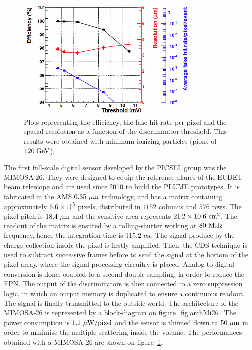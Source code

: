     \begin{figure}
      \centering
      \includegraphics[width=0.8\textwidth]{Pictures/vxd/MIMOSA26_chip26_HR15_20deg}
      \caption{Plots representing the efficiency, the fake hit rate per pixel and the spatial resolution as a function of the discriminator threshold. This results were obtained with minimum ionizing particles (pions of $120~\rm{GeV}$).}
      \label{fig:mi26Perf}
    \end{figure}

    The first full-scale digital sensor developed by the PICSEL group was the \gls{MIMOSA}-26.
    They were designed to equip the reference planes of the EUDET beam telescope and are used since 2010 to build the PLUME prototypes.
    It is fabricated in the AMS $0.35~\rm{\mu m}$ technology, and has a matrix containing approximately $6.6 \times 10^5$ pixels, distributed in $1152$ columns and $576$ rows.
    The pixel pitch is $18.4~\rm{\mu m}$ and the sensitive area represents $21.2 \times 10.6~\rm{cm}^2$.
    The readout of the matrix is ensured by a rolling-shutter working at $80~\rm{MHz}$ frequency, hence the integration time is $115.2~\rm{\mu s}$.
    The signal produce by the charge collection inside the pixel is firstly amplified.
    Then, the \gls{CDS} technique is used to subtract successive frames before to send the signal at the bottom of the pixel array, where the signal processing circuitry is placed.
    Analog to digital conversion is done, coupled to a second double sampling, in order to reduce the \gls{FPN}.
    The output of the discriminators is then connected to a zero suppression logic, in which an output memory is duplicated to ensure a continuous readout.
    The signal is finally transmitted to the outside world.
    The architecture of the \gls{MIMOSA}-26 is represented by a block-diagram on figure~\ref{fig:archMi26}.
    The power consumption is $1.1~\rm{\mu W/pixel}$ and the sensor is thinned down to $50~\rm{\mu m}$ in order to minimise the multiple scattering inside the volume.
    The performances obtained with a \gls{MIMOSA}-26 are shown on figure~\ref{fig:mi26Perf}.

